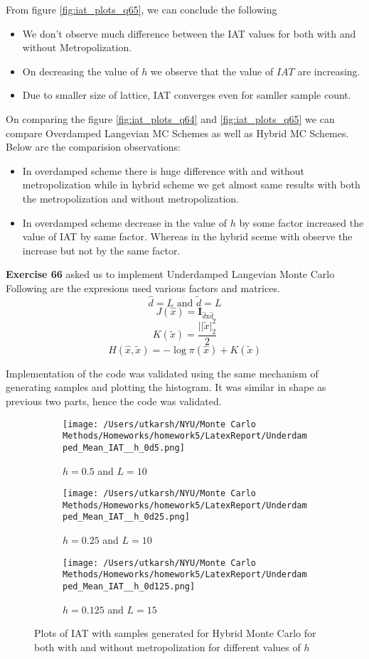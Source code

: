 \documentclass[11pt]{article}
\begin{document}
From figure \ref{fig:iat_plots_q65}, we can conclude the following
\begin{itemize}
	\item We don't observe much difference between the IAT values for both with and without Metropolization.
	\item On decreasing the value of $h$ we observe that the value of $IAT$ are increasing.
	\item Due to smaller size of lattice, IAT converges even for samller sample count.
\end{itemize}

On comparing the figure \ref{fig:iat_plots_q64} and \ref{fig:iat_plots_q65} we can compare Overdamped Langevian MC Schemes as well as Hybrid MC Schemes. Below are the comparision observations:
\begin{itemize}
	\item In overdamped scheme there is huge difference with and without metropolization while in hybrid scheme we get almost same results with both the metropolization and without metropolization.
	\item In overdamped scheme decrease in the value of $h$ by some factor increased the value of IAT by same factor. Whereas in the hybrid sceme with observe the increase but not by the same factor.
\end{itemize}

\noindent \textbf{Exercise 66} asked us to implement Underdamped Langevian Monte Carlo
Following are the expresions used various factors and matrices.
$$\hat{d} = L \text{   and     } \tilde{d} = L$$
$$J(\hat{x}) = \textbf{I}_{\hat{d} \text{x} \hat{d}}$$
$$K(\tilde{x}) = \frac{||\tilde{x}|^2_2}{2}$$
$$H(\hat{x}, \tilde{x}) = - \log \pi(\hat{x}) + K(\tilde{x})$$

\noindent Implementation of the code was validated using the same mechanism of generating samples and plotting the histogram. It was similar in
shape as previous two parts, hence the code was validated.


\begin{figure}[H]
	\centering
	\begin{subfigure}{.45\textwidth}
		\texttt{[image: /Users/utkarsh/NYU/Monte Carlo Methods/Homeworks/homework5/LatexReport/Underdamped\_Mean\_IAT\_\_h\_0d5.png]}
		\caption{$h = 0.5$ and $L = 10$}
	\end{subfigure}
	\begin{subfigure}{.45\textwidth}
		\texttt{[image: /Users/utkarsh/NYU/Monte Carlo Methods/Homeworks/homework5/LatexReport/Underdamped\_Mean\_IAT\_\_h\_0d25.png]}
		\caption{$h = 0.25$ and $L = 10$}
	\end{subfigure}
	\begin{subfigure}{.45\textwidth}
		\texttt{[image: /Users/utkarsh/NYU/Monte Carlo Methods/Homeworks/homework5/LatexReport/Underdamped\_Mean\_IAT\_\_h\_0d125.png]}
		\caption{$h = 0.125$ and $L = 15$}
	\end{subfigure}
	\caption{Plots of IAT with samples generated for Hybrid Monte Carlo for both with and without metropolization for different values of $h$}
	\label{fig:iat_plots_q66}
\end{figure}
\end{document}
